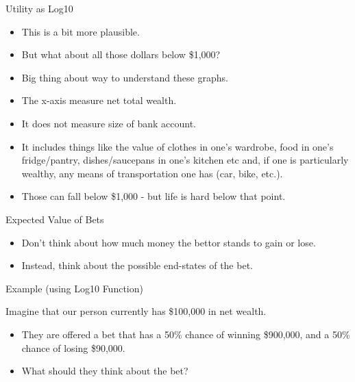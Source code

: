 \documentclass[
  ignorenonframetext,
]{beamer}
\providecommand{\tightlist}{%
  \setlength{\itemsep}{0pt}\setlength{\parskip}{0pt}}
\renewcommand{\,}{\text{, }}
\begin{document}
\begin{frame}{Utility as Log10}
\protect\hypertarget{utility-as-log10-1}{}

\begin{itemize}
\tightlist
\item
  This is a bit more plausible.
\item
  But what about all those dollars below \$1,000?
\item
  Big thing about way to understand these graphs.
\item
  The x-axis measure net total wealth.
\item
  It does not measure size of bank account.
\item
  It includes things like the value of clothes in one's wardrobe, food
  in one's fridge/pantry, dishes/saucepans in one's kitchen etc and, if
  one is particularly wealthy, any means of transportation one has (car,
  bike, etc.).
\item
  Those can fall below \$1,000 - but life is hard below that point.
\end{itemize}

\end{frame}

\begin{frame}{Expected Value of Bets}
\protect\hypertarget{expected-value-of-bets}{}

\begin{itemize}
\tightlist
\item
  Don't think about how much money the bettor stands to gain or lose.
\item
  Instead, think about the possible end-states of the bet.
\end{itemize}

\end{frame}

\begin{frame}{Example (using Log10 Function)}
\protect\hypertarget{example-using-log10-function}{}

Imagine that our person currently has \$100,000 in net wealth. \pause

\begin{itemize}
\tightlist
\item
  They are offered a bet that has a 50\% chance of winning \$900,000,
  and a 50\% chance of losing \$90,000.
\item
  What should they think about the bet?
\end{itemize}

\end{frame}
\end{document}
